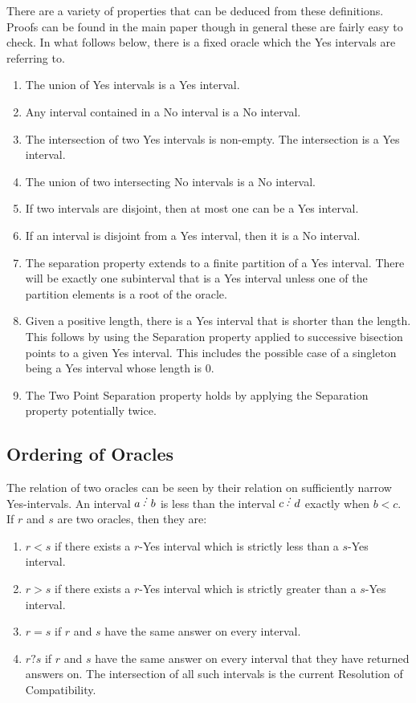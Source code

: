 \documentclass[12pt]{article}
\theoremstyle{remark}
\begin{document}
There are a variety of properties that can be deduced from these definitions. Proofs can be found in the main paper though in general these are fairly easy to check. In what follows below, there is a fixed oracle which the Yes intervals are referring to.

\begin{enumerate}
    \item The union of Yes intervals is a Yes interval. 
    \item Any interval contained in a No interval is a No interval. 
    \item The intersection of two Yes intervals is non-empty. The intersection is a Yes interval. 
    \item The union of two intersecting No intervals is a No interval. 
    \item If two intervals are disjoint, then at most one can be a Yes interval. 
    \item If an interval is disjoint from a Yes interval, then it is a No interval. 
    \item The separation property extends to a finite partition of a Yes interval. There will be exactly one subinterval that is a Yes interval unless one of the partition elements is a root of the oracle.   
    \item Given a positive length, there is a Yes interval that is shorter than the length. This follows by using the Separation property applied to successive bisection points to a given Yes interval. This includes the possible case of a singleton being a Yes interval whose length is 0. 
    \item The Two Point Separation property holds by applying the Separation property potentially twice. 
\end{enumerate}

\subsection{Ordering of Oracles}

The relation of two oracles can be seen by their relation on sufficiently narrow Yes-intervals. An interval $a\lte b$ is less than the interval $c\lte d$ exactly when $b < c$. If $r$ and $s$ are two oracles, then they are:
\begin{enumerate}
\item $r<s$ if there exists a $r$-Yes interval which is strictly less than a $s$-Yes interval.
\item $r>s$ if there exists a $r$-Yes interval which is strictly greater than a $s$-Yes interval.
\item $r=s$ if $r$ and $s$ have the same answer on every interval.
\item $r?s$ if $r$ and $s$ have the same answer on every interval that they have returned answers on. The intersection of all such intervals is the current Resolution of Compatibility. 
\end{enumerate}
\end{document}
